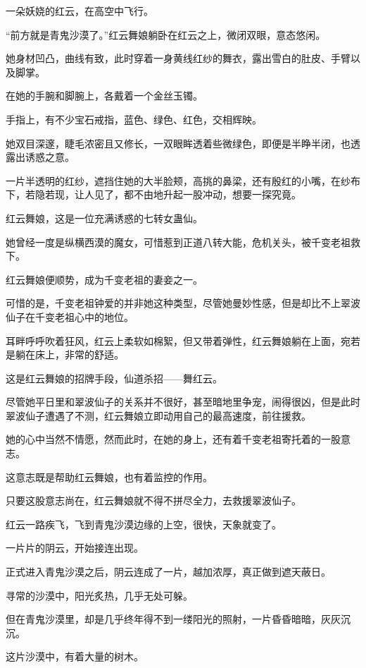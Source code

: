 
\begin{this_body}

一朵妖娆的红云，在高空中飞行。

“前方就是青鬼沙漠了。”红云舞娘躺卧在红云之上，微闭双眼，意态悠闲。

她身材凹凸，曲线有致，此时穿着一身黄线红纱的舞衣，露出雪白的肚皮、手臂以及脚掌。

在她的手腕和脚腕上，各戴着一个金丝玉镯。

手指上，有不少宝石戒指，蓝色、绿色、红色，交相辉映。

她双目深邃，睫毛浓密且又修长，一双眼眸透着些微绿色，即便是半睁半闭，也透露出诱惑之意。

一片半透明的红纱，遮挡住她的大半脸颊，高挑的鼻梁，还有殷红的小嘴，在纱布下，若隐若现，让人见了，都不由地升起一股冲动，想要一探究竟。

红云舞娘，这是一位充满诱惑的七转女蛊仙。

她曾经一度是纵横西漠的魔女，可惜惹到正道八转大能，危机关头，被千变老祖救下。

红云舞娘便顺势，成为千变老祖的妻妾之一。

可惜的是，千变老祖钟爱的并非她这种类型，尽管她曼妙性感，但是却比不上翠波仙子在千变老祖心中的地位。

耳畔呼呼吹着狂风，红云上柔软如棉絮，但又带着弹性，红云舞娘躺在上面，宛若是躺在床上，非常的舒适。

这是红云舞娘的招牌手段，仙道杀招——舞红云。

尽管她平日里和翠波仙子的关系并不很好，甚至暗地里争宠，闹得很凶，但是此时翠波仙子遭遇了不测，红云舞娘立即动用自己的最高速度，前往援救。

她的心中当然不情愿，然而此时，在她的身上，还有着千变老祖寄托着的一股意志。

这意志既是帮助红云舞娘，也有着监控的作用。

只要这股意志尚在，红云舞娘就不得不拼尽全力，去救援翠波仙子。

红云一路疾飞，飞到青鬼沙漠边缘的上空，很快，天象就变了。

一片片的阴云，开始接连出现。

正式进入青鬼沙漠之后，阴云连成了一片，越加浓厚，真正做到遮天蔽日。

寻常的沙漠中，阳光炙热，几乎无处可躲。

但在青鬼沙漠里，却是几乎终年得不到一缕阳光的照射，一片昏昏暗暗，灰灰沉沉。

这片沙漠中，有着大量的树木。


\end{this_body}
